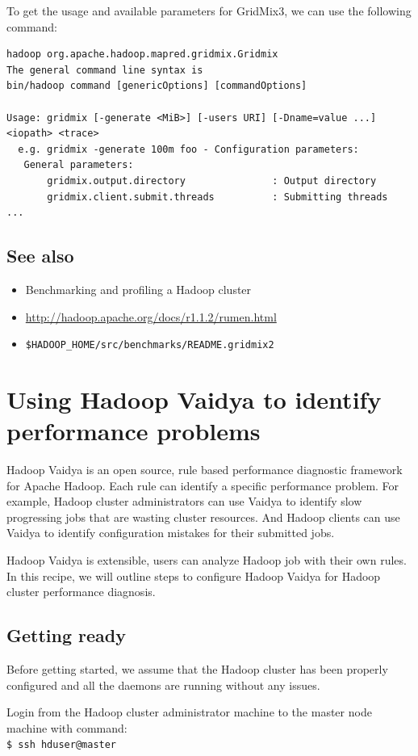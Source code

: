 To get the usage and available parameters for GridMix3, we can use the following command:
\lstset{style=bashstyle}
\begin{lstlisting}
hadoop org.apache.hadoop.mapred.gridmix.Gridmix
The general command line syntax is
bin/hadoop command [genericOptions] [commandOptions]

Usage: gridmix [-generate <MiB>] [-users URI] [-Dname=value ...] <iopath> <trace>
  e.g. gridmix -generate 100m foo - Configuration parameters:
   General parameters:
       gridmix.output.directory               : Output directory
       gridmix.client.submit.threads          : Submitting threads
...
\end{lstlisting}
\subsection*{See also}
\begin{itemize}
  \item Benchmarking and profiling a Hadoop cluster
  \item \url{http://hadoop.apache.org/docs/r1.1.2/rumen.html}
  \item \verb|$HADOOP_HOME/src/benchmarks/README.gridmix2|
\end{itemize}

\section{Using Hadoop Vaidya to identify performance problems}
Hadoop Vaidya is an open source, rule based performance diagnostic framework for Apache Hadoop. Each rule can identify a specific performance problem. For example, Hadoop cluster administrators can use Vaidya to identify slow progressing jobs that are wasting cluster resources. And Hadoop clients can use Vaidya to identify configuration mistakes for their submitted jobs.

Hadoop Vaidya is extensible, users can analyze Hadoop job with their own rules. In this recipe, we will outline steps to configure Hadoop Vaidya for Hadoop cluster performance diagnosis.

\subsection*{Getting ready}
Before getting started, we assume that the Hadoop cluster has been properly configured and all the daemons are running without any issues.

Login from the Hadoop cluster administrator machine to the master node machine with command:\\
\verb|$ ssh hduser@master|
